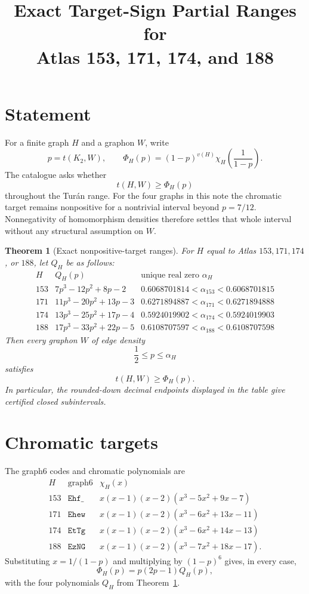 \documentclass[11pt]{article}
\title{Exact Target-Sign Partial Ranges for\\
Atlas 153, 171, 174, and 188}
\author{}
\date{}
\newtheorem{theorem}{Theorem}
\begin{document}
\maketitle

\section{Statement}

For a finite graph $H$ and a graphon $W$, write
\[
 p=t(K_2,W),
 \qquad
 \Phi_H(p)
 =(1-p)^{v(H)}\chi_H\!\left(\frac1{1-p}\right).
\]
The catalogue asks whether
\[
 t(H,W)\geq\Phi_H(p)
\]
throughout the Tur\'an range.  For the four graphs in this note the
chromatic target remains nonpositive for a nontrivial interval beyond
$p=7/12$.  Nonnegativity of homomorphism densities therefore settles that
whole interval without any structural assumption on $W$.

\begin{theorem}[Exact nonpositive-target ranges]\label{thm:main}
For $H$ equal to Atlas $153,171,174$, or $188$, let $Q_H$ be as follows:
\[
\begin{array}{c|c|c}
H&Q_H(p)&\text{unique real zero }\alpha_H\\ \hline
153&7p^3-12p^2+8p-2&0.6068701814<\alpha_{153}<0.6068701815\\
171&11p^3-20p^2+13p-3&0.6271894887<\alpha_{171}<0.6271894888\\
174&13p^3-25p^2+17p-4&0.5924019902<\alpha_{174}<0.5924019903\\
188&17p^3-33p^2+22p-5&0.6108707597<\alpha_{188}<0.6108707598
\end{array}
\]
Then every graphon $W$ of edge density
\[
 \frac12\leq p\leq\alpha_H
\]
satisfies
\[
 t(H,W)\geq\Phi_H(p).
\]
In particular, the rounded-down decimal endpoints displayed in the table
give certified closed subintervals.
\end{theorem}

\section{Chromatic targets}

The graph6 codes and chromatic polynomials are
\[
\begin{array}{c|c|c}
H&\text{graph6}&\chi_H(x)\\ \hline
153&\texttt{Ehf\_}&x(x-1)(x-2)(x^3-5x^2+9x-7)\\
171&\texttt{Ehew}&x(x-1)(x-2)(x^3-6x^2+13x-11)\\
174&\texttt{EtTg}&x(x-1)(x-2)(x^3-6x^2+14x-13)\\
188&\texttt{EzNG}&x(x-1)(x-2)(x^3-7x^2+18x-17).
\end{array}
\]
Substituting $x=1/(1-p)$ and multiplying by $(1-p)^6$ gives, in every
case,
\begin{equation}\label{eq:target}
 \Phi_H(p)=p(2p-1)Q_H(p),
\end{equation}
with the four polynomials $Q_H$ from Theorem~\ref{thm:main}.
\end{document}
